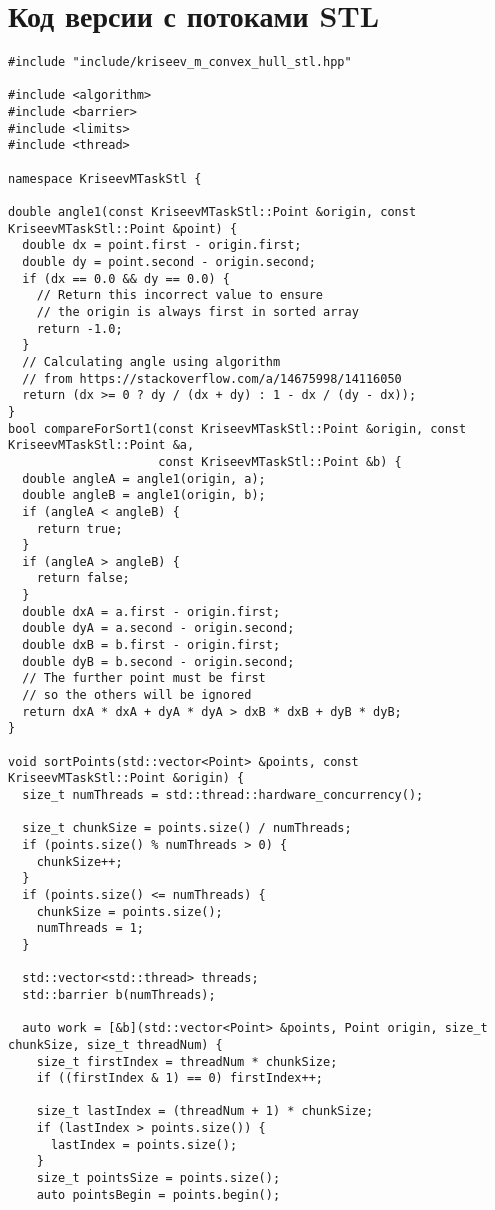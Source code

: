 \documentclass[a4paper,12pt]{article}
\begin{document}
\section{Код версии с потоками STL}

\begin{lstlisting}
#include "include/kriseev_m_convex_hull_stl.hpp"

#include <algorithm>
#include <barrier>
#include <limits>
#include <thread>

namespace KriseevMTaskStl {

double angle1(const KriseevMTaskStl::Point &origin, const KriseevMTaskStl::Point &point) {
  double dx = point.first - origin.first;
  double dy = point.second - origin.second;
  if (dx == 0.0 && dy == 0.0) {
    // Return this incorrect value to ensure 
    // the origin is always first in sorted array
    return -1.0;
  }
  // Calculating angle using algorithm 
  // from https://stackoverflow.com/a/14675998/14116050
  return (dx >= 0 ? dy / (dx + dy) : 1 - dx / (dy - dx));
}
bool compareForSort1(const KriseevMTaskStl::Point &origin, const KriseevMTaskStl::Point &a,
                     const KriseevMTaskStl::Point &b) {
  double angleA = angle1(origin, a);
  double angleB = angle1(origin, b);
  if (angleA < angleB) {
    return true;
  }
  if (angleA > angleB) {
    return false;
  }
  double dxA = a.first - origin.first;
  double dyA = a.second - origin.second;
  double dxB = b.first - origin.first;
  double dyB = b.second - origin.second;
  // The further point must be first
  // so the others will be ignored
  return dxA * dxA + dyA * dyA > dxB * dxB + dyB * dyB;
}

void sortPoints(std::vector<Point> &points, const KriseevMTaskStl::Point &origin) {
  size_t numThreads = std::thread::hardware_concurrency();

  size_t chunkSize = points.size() / numThreads;
  if (points.size() % numThreads > 0) {
    chunkSize++;
  }
  if (points.size() <= numThreads) {
    chunkSize = points.size();
    numThreads = 1;
  }

  std::vector<std::thread> threads;
  std::barrier b(numThreads);

  auto work = [&b](std::vector<Point> &points, Point origin, size_t chunkSize, size_t threadNum) {
    size_t firstIndex = threadNum * chunkSize;
    if ((firstIndex & 1) == 0) firstIndex++;

    size_t lastIndex = (threadNum + 1) * chunkSize;
    if (lastIndex > points.size()) {
      lastIndex = points.size();
    }
    size_t pointsSize = points.size();
    auto pointsBegin = points.begin();
    

\end{lstlisting}
\end{document}

